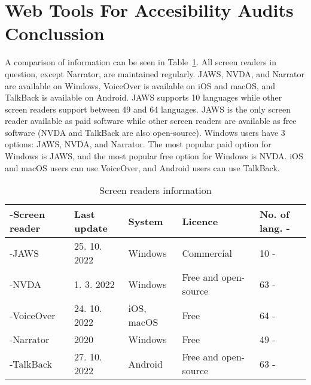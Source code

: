 \section{Web Tools For Accesibility Audits Conclussion}

A comparison of information can be seen in  Table~\ref{tab:screen-readers-info}. All screen readers in question, except Narrator, are maintained regularly. JAWS, NVDA, and Narrator are available on Windows, VoiceOver is available on iOS and macOS, and TalkBack is available on Android. JAWS supports 10 languages while other screen readers support between 49 and 64 languages. JAWS is the only screen reader available as paid software while other screen readers are available as free software (NVDA and TalkBack are also open-source). Windows users have 3 options: JAWS, NVDA, and Narrator. The most popular paid option for Windows is JAWS, and the most popular free option for Windows is NVDA. iOS and macOS users can use VoiceOver, and Android users can use TalkBack.

\begin{table}[tp]
\tablestretch
{}
\centering
\begin{tabularx}{\linewidth}
{>{\kern-\tabcolsep}lllXX<{\kern-\tabcolsep}}
\toprule
\textbf{Screen reader} & \textbf{Last update} & \textbf{System} & \textbf{Licence} & \textbf{No. of lang.} \\
\midrule
JAWS & 25. 10. 2022 & Windows & Commercial & 10 \\
%
NVDA & 1. 3. 2022 & Windows & Free and open-source & 63 \\
%
VoiceOver & 24. 10. 2022 & iOS, macOS & Free & 64 \\
%
Narrator & 2020 & Windows & Free & 49 \\
%
TalkBack & 27. 10. 2022 & Android & Free and open-source & 63 \\
\bottomrule
\end{tabularx}

\caption[Screen Readers Information]
{
Screen readers information
}
\label{tab:screen-readers-info}
\end{table}


